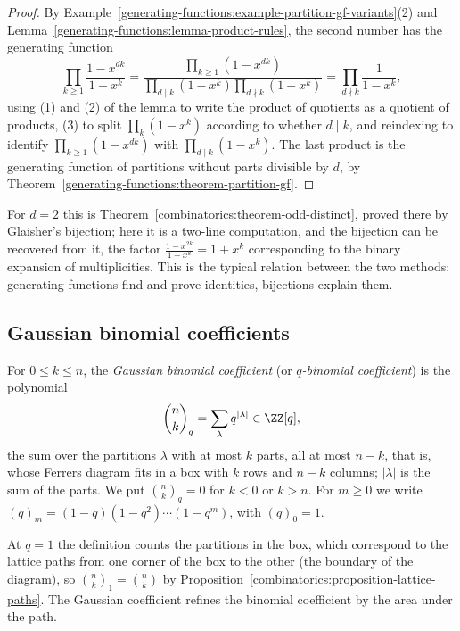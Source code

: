\begin{proof}
By Example~\ref{generating-functions:example-partition-gf-variants}(2) and Lemma~\ref{generating-functions:lemma-product-rules}, the second number has the generating function
\[
\prod_{k \geq 1}\frac{1 - x^{dk}}{1 - x^k} = \frac{\prod_{k \geq 1}(1 - x^{dk})}{\prod_{d \mid k}(1 - x^k)\prod_{d \nmid k}(1 - x^k)} = \prod_{d \nmid k}\frac{1}{1 - x^k},
\]
using (1) and (2) of the lemma to write the product of quotients as a quotient of products, (3) to split $\prod_k(1 - x^k)$ according to whether $d \mid k$, and reindexing to identify
$\prod_{k \geq 1}(1 - x^{dk})$ with $\prod_{d \mid k}(1 - x^k)$. The last product is the generating function of partitions without parts divisible by $d$, by Theorem~\ref{generating-functions:theorem-partition-gf}.
\end{proof}

For $d = 2$ this is Theorem~\ref{combinatorics:theorem-odd-distinct}, proved there by Glaisher's bijection; here it is a two-line computation, and the bijection can be recovered from it, the factor
$\frac{1 - x^{2k}}{1 - x^k} = 1 + x^k$ corresponding to the binary expansion of multiplicities. This is the typical relation between the two methods: generating functions find and prove identities,
bijections explain them.

\subsection{Gaussian binomial coefficients}\label{generating-functions:subsection-gaussian}

\begin{definition}\label{generating-functions:definition-gaussian}
For $0 \leq k \leq n$, the \emph{Gaussian binomial coefficient} (or \emph{$q$-binomial coefficient}) is the polynomial
\[
\binom{n}{k}_q = \sum_{\lambda}q^{|\lambda|} \in \ZZ[q],
\]
the sum over the partitions $\lambda$ with at most $k$ parts, all at most $n - k$, that is, whose Ferrers diagram fits in a box with $k$ rows and $n - k$ columns; $|\lambda|$ is the sum of the parts.
We put $\binom{n}{k}_q = 0$ for $k < 0$ or $k > n$. For $m \geq 0$ we write $(q)_m = (1 - q)(1 - q^2) \cdots (1 - q^m)$, with $(q)_0 = 1$.
\end{definition}

At $q = 1$ the definition counts the partitions in the box, which correspond to the lattice paths from one corner of the box to the other (the boundary of the diagram), so
$\binom{n}{k}_1 = \binom{n}{k}$ by Proposition~\ref{combinatorics:proposition-lattice-paths}. The Gaussian coefficient refines the binomial coefficient by the area under the path.

